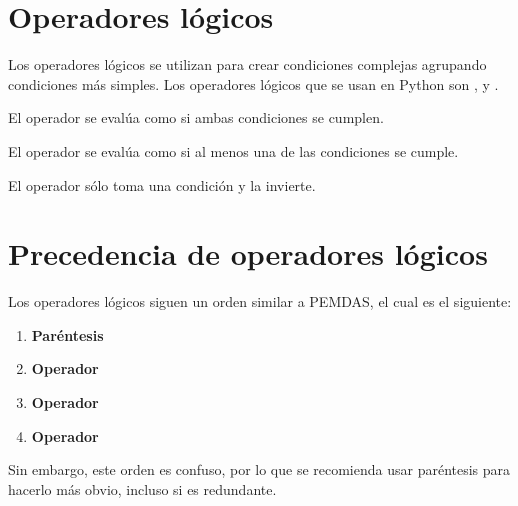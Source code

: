 \section{Operadores lógicos}

Los operadores lógicos se utilizan para crear condiciones complejas agrupando condiciones más simples.
Los operadores lógicos que se usan en Python son ,  y .

El operador  se evalúa como  si ambas condiciones se cumplen.


El operador  se evalúa como  si al menos una de las condiciones se cumple.


El operador  sólo toma una condición y la invierte.


\section{Precedencia de operadores lógicos}

Los operadores lógicos siguen un orden similar a PEMDAS, el cual es el siguiente:

\begin{enumerate}
  \item \textbf{Paréntesis} \ttt{()}
  
  \item \textbf{Operador } 
  
  \item \textbf{Operador } 
  
  \item \textbf{Operador } 
  
\end{enumerate}

Sin embargo, este orden es confuso, por lo que se recomienda usar paréntesis para hacerlo más obvio, incluso si es redundante.


\clearpage